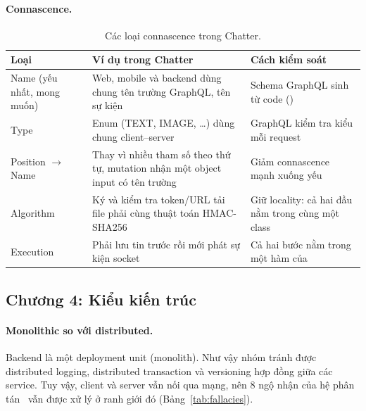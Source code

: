 \documentclass[11pt, a4paper]{article}
\begin{document}
\paragraph{Connascence.}
\begin{table}[H]
  \centering
  \small
  \caption{Các loại connascence trong Chatter.}
  \label{tab:connascence}
  \begin{tabularx}{\linewidth}{P{2.8cm}YY}
    \toprule
    \textbf{Loại} & \textbf{Ví dụ trong Chatter} & \textbf{Cách kiểm soát} \\
    \midrule
    Name (yếu nhất, mong muốn) & Web, mobile và backend dùng chung tên trường GraphQL, tên sự kiện  & Schema GraphQL sinh từ code () \\
    Type & Enum  (TEXT, IMAGE, \dots) dùng chung client--server & GraphQL kiểm tra kiểu mỗi request \\
    Position $\rightarrow$ Name & Thay vì nhiều tham số theo thứ tự, mutation nhận một object input có tên trường & Giảm connascence mạnh xuống yếu \\
    Algorithm & Ký và kiểm tra token/URL tải file phải cùng thuật toán HMAC-SHA256 & Giữ locality: cả hai đầu nằm trong cùng một class \\
    Execution & Phải lưu tin trước rồi mới phát sự kiện socket & Cả hai bước nằm trong một hàm của  \\
    \bottomrule
  \end{tabularx}
\end{table}

\subsection{Chương 4: Kiểu kiến trúc}

\paragraph{Monolithic so với distributed.} Backend là một deployment unit (monolith). Như vậy nhóm tránh được distributed logging, distributed transaction và versioning hợp đồng giữa các service. Tuy vậy, client và server vẫn nối qua mạng, nên 8 ngộ nhận của hệ phân tán~\cite{richards2020fundamentals} vẫn được xử lý ở ranh giới đó (Bảng~\ref{tab:fallacies}).
\end{document}
